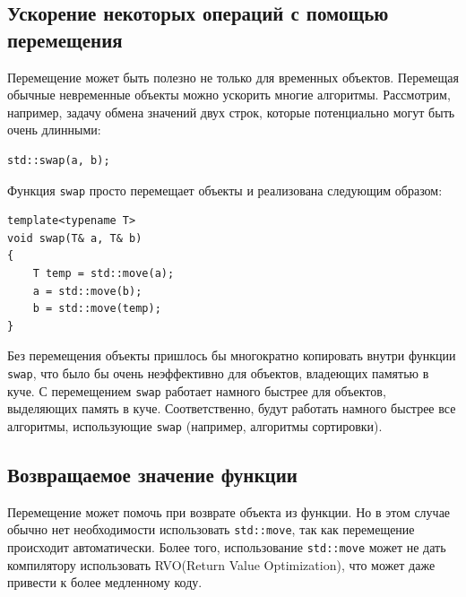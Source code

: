 \documentclass{article}
\begin{document}
\subsection*{Ускорение некоторых операций с помощью перемещения}
Перемещение может быть полезно не только для временных объектов. Перемещая обычные невременные объекты можно ускорить многие алгоритмы. Рассмотрим, например, задачу обмена значений двух строк, которые потенциально могут быть очень длинными:
\begin{lstlisting}
std::swap(a, b);
\end{lstlisting}
Функция \texttt{swap} просто перемещает объекты и реализована следующим образом:
\begin{lstlisting}
template<typename T> 
void swap(T& a, T& b) 
{
    T temp = std::move(a);
    a = std::move(b);
    b = std::move(temp);
}
\end{lstlisting}
Без перемещения объекты пришлось бы многократно копировать внутри функции \texttt{swap}, что было бы очень неэффективно для объектов, владеющих памятью в куче. С перемещением \texttt{swap} работает намного быстрее для объектов, выделяющих память в куче. Соответственно, будут работать намного быстрее все алгоритмы, использующие \texttt{swap} (например, алгоритмы сортировки).

\subsection*{Возвращаемое значение функции}
Перемещение может помочь при возврате объекта из функции. Но в этом случае обычно нет необходимости использовать \texttt{std::move}, так как перемещение происходит автоматически. Более того, использование \texttt{std::move} может не дать компилятору использовать RVO(Return Value Optimization), что может даже привести к более медленному коду.


\newpage
\end{document}
